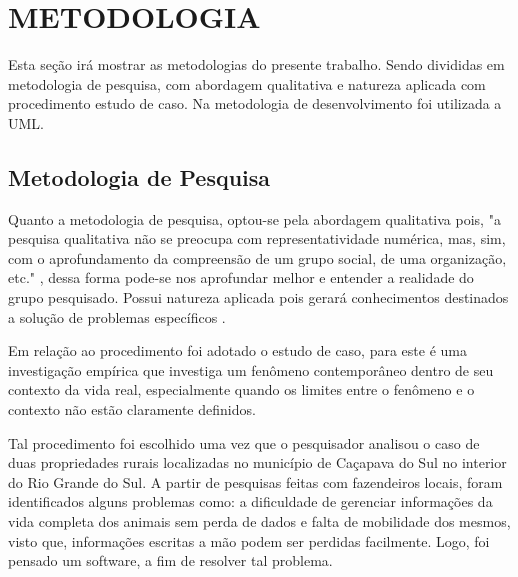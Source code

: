 %
%



\section{METODOLOGIA}\label{chap:metodologia}

Esta seção irá mostrar as metodologias do presente trabalho. Sendo divididas em metodologia de pesquisa, com abordagem qualitativa e natureza aplicada com procedimento estudo de caso. Na metodologia de desenvolvimento foi utilizada a UML.

\subsection{\textbf{Metodologia de Pesquisa}}

Quanto a metodologia de pesquisa, optou-se pela abordagem qualitativa pois, "a pesquisa qualitativa não se preocupa com representatividade numérica, mas, sim, com o aprofundamento da compreensão de um grupo social, de uma organização, etc."  \cite{ufrgs09}, dessa forma pode-se nos aprofundar melhor e entender a realidade do grupo pesquisado. Possui natureza aplicada pois gerará conhecimentos destinados a solução de problemas específicos \cite{ufrgs09} .

Em relação ao procedimento foi adotado o estudo de caso, para  este é uma investigação empírica que investiga um fenômeno contemporâneo dentro de seu contexto da vida real, especialmente quando os limites entre o fenômeno e o contexto não estão claramente definidos.

Tal procedimento foi  escolhido uma vez que o pesquisador analisou o caso de duas propriedades rurais localizadas no município de Caçapava do Sul no interior do Rio Grande do Sul. A partir de pesquisas  feitas com fazendeiros locais, foram identificados alguns problemas como: a dificuldade de gerenciar informações da vida completa dos animais sem perda de  dados e falta de mobilidade dos mesmos, visto que, informações escritas a mão podem ser perdidas facilmente. Logo, foi pensado um software, a fim de resolver tal problema.

